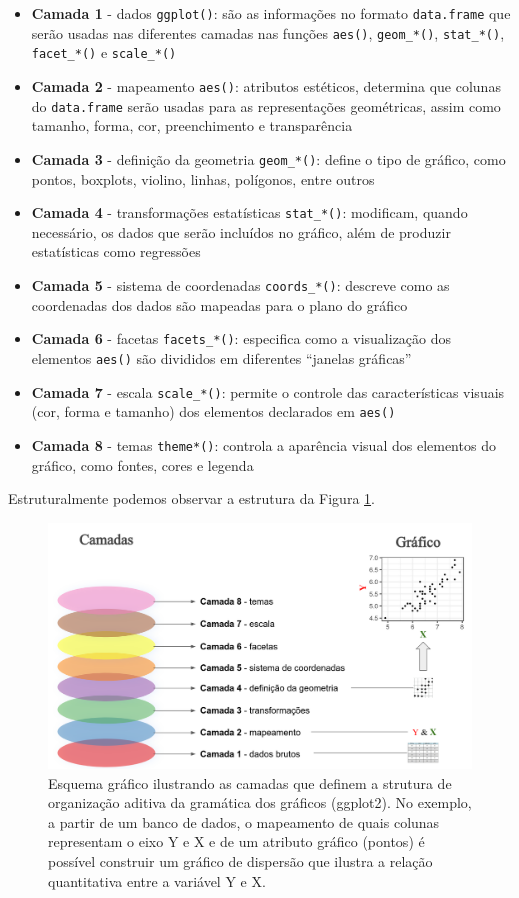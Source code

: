 \documentclass[
]{article}
\providecommand{\tightlist}{%
  \setlength{\itemsep}{0pt}\setlength{\parskip}{0pt}}
\begin{document}
\begin{itemize}
\tightlist
\item
  \textbf{Camada 1} - dados \texttt{ggplot()}: são as informações no formato \texttt{data.frame} que serão usadas nas diferentes camadas nas funções \texttt{aes()}, \texttt{geom\_*()}, \texttt{stat\_*()}, \texttt{facet\_*()} e \texttt{scale\_*()}
\item
  \textbf{Camada 2} - mapeamento \texttt{aes()}: atributos estéticos, determina que colunas do \texttt{data.frame} serão usadas para as representações geométricas, assim como tamanho, forma, cor, preenchimento e transparência
\item
  \textbf{Camada 3} - definição da geometria \texttt{geom\_*()}: define o tipo de gráfico, como pontos, boxplots, violino, linhas, polígonos, entre outros
\item
  \textbf{Camada 4} - transformações estatísticas \texttt{stat\_*()}: modificam, quando necessário, os dados que serão incluídos no gráfico, além de produzir estatísticas como regressões
\item
  \textbf{Camada 5} - sistema de coordenadas \texttt{coords\_*()}: descreve como as coordenadas dos dados são mapeadas para o plano do gráfico
\item
  \textbf{Camada 6} - facetas \texttt{facets\_*()}: especifica como a visualização dos elementos \texttt{aes()} são divididos em diferentes ``janelas gráficas''
\item
  \textbf{Camada 7} - escala \texttt{scale\_*()}: permite o controle das características visuais (cor, forma e tamanho) dos elementos declarados em \texttt{aes()}
\item
  \textbf{Camada 8} - temas \texttt{theme*()}: controla a aparência visual dos elementos do gráfico, como fontes, cores e legenda
\end{itemize}

Estruturalmente podemos observar a estrutura da Figura \ref{fig:fig-camadas}.

\begin{figure}

{\centering \includegraphics[width=0.65\linewidth,height=0.65\textheight]{figures/cap06_fig01} 

}

\caption{Esquema gráfico ilustrando as camadas que definem a strutura de organização aditiva da gramática dos gráficos (ggplot2). No exemplo, a partir de um banco de dados, o mapeamento de quais colunas representam o eixo Y e X e de um atributo gráfico (pontos) é possível construir um gráfico de dispersão que ilustra a relação quantitativa entre a variável Y e X.}\label{fig:fig-camadas}
\end{figure}
\end{document}
